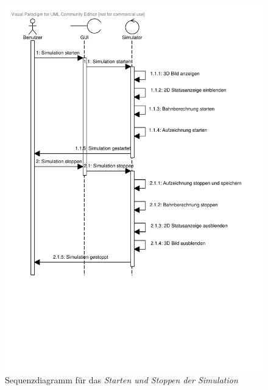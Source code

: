\begin{figure}
\includegraphics[width=\linewidth]{bilder/Starten_Stoppen.pdf}
\caption{Sequenzdiagramm für das \textit{Starten und Stoppen der Simulation}}
\label{fig:Starten_Stoppen}
\end{figure}

